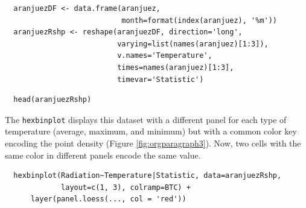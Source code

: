 
\lstset{language=R,label= ,caption= ,captionpos=b,numbers=none}
\begin{lstlisting}
  aranjuezDF <- data.frame(aranjuez,
                           month=format(index(aranjuez), '%m'))
  aranjuezRshp <- reshape(aranjuezDF, direction='long',
                          varying=list(names(aranjuez)[1:3]),
                          v.names='Temperature',
                          times=names(aranjuez)[1:3],
                          timevar='Statistic')
\end{lstlisting}


\lstset{language=R,label= ,caption= ,captionpos=b,numbers=none}
\begin{lstlisting}
  head(aranjuezRshp)
\end{lstlisting}

The \texttt{hexbinplot} displays this dataset with a different panel for
each type of temperature (average, maximum, and minimum) but with a
common color key encoding the point density (Figure
\ref{fig:orgparagraph3}). Now, two cells with the same color in
different panels encode the same value. 

\lstset{language=R,label= ,caption= ,captionpos=b,numbers=none}
\begin{lstlisting}
  hexbinplot(Radiation~Temperature|Statistic, data=aranjuezRshp,
             layout=c(1, 3), colramp=BTC) +
      layer(panel.loess(..., col = 'red'))
\end{lstlisting}


